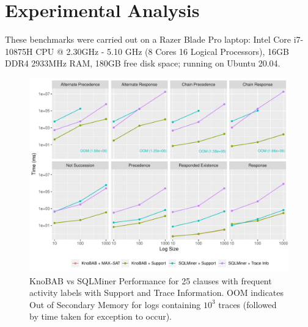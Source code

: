 
\section{Experimental Analysis}\label{sec:exp}
These benchmarks were carried out on a Razer Blade Pro laptop: Intel Core i7-10875H CPU @ 2.30GHz - 5.10 GHz (8 Cores 16 Logical Processors), 16GB DDR4 2933MHz RAM, 180GB free disk space; running on Ubuntu 20.04.

\begin{figure}[!t]
	\centering
	\includegraphics[width=.65\textwidth]{images/sqlminer_benchmark.pdf}
	\caption{KnoBAB vs SQLMiner Performance for 25 clauses with frequent activity labels with Support and Trace Information. OOM indicates Out of Secondary Memory for logs containing $10^3$ traces (followed by time taken for exception to occur).}\label{fig:vsSQL}
\end{figure}


